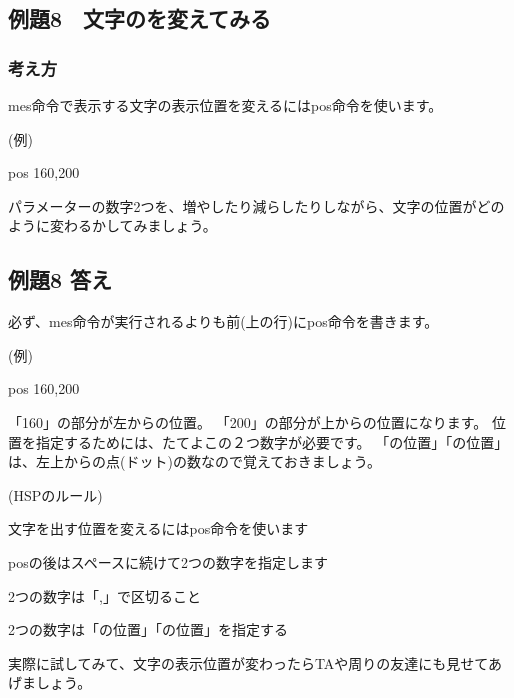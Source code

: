 \documentclass[text02.tex]{subfiles}
\begin{document}
\clearpage

\subsection{例題8　文字のを変えてみる}

\subsubsection*{考え方}

mes命令で表示する文字の表示位置を変えるにはpos命令を使います。

\begin{description}
    \item (例)
    \item pos 160,200
\end{description}

パラメーターの数字2つを、増やしたり減らしたりしながら、文字の位置がどのように変わるかしてみましょう。

\subsection*{例題8 答え}

必ず、mes命令が実行されるよりも前(上の行)にpos命令を書きます。

\begin{description}
    \item (例)
    \item pos 160,200
\end{description}

「160」の部分が左からの位置。
「200」の部分が上からの位置になります。
位置を指定するためには、たてよこの２つ数字が必要です。
「の位置」「の位置」は、左上からの点(ドット)の数なので覚えておきましょう。

\begin{description}
    \item (HSPのルール)
\end{description}

\begin{description}
    \item 文字を出す位置を変えるにはpos命令を使います
    \item posの後はスペースに続けて2つの数字を指定します
    \item 2つの数字は「,」で区切ること
    \item 2つの数字は「の位置」「の位置」を指定する
\end{description}

実際に試してみて、文字の表示位置が変わったらTAや周りの友達にも見せてあげましょう。
\end{document}
